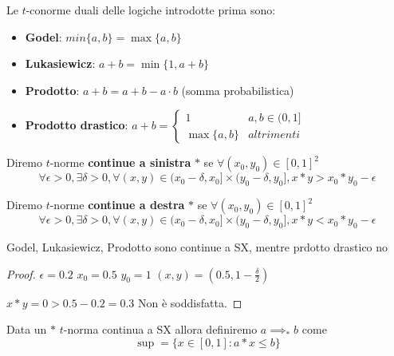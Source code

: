\begin{esempio}
    Le $t$-conorme duali delle logiche introdotte prima sono:
    \begin{itemize}
        \item \textbf{Godel}: $min\{a,b\} = \max\{a,b\}$
        \item \textbf{Lukasiewicz}: $a+b = \min\{1,a+b\}$
        \item \textbf{Prodotto}: $a+b = a+b-a\cdot b$ (somma probabilistica)
        \item \textbf{Prodotto drastico}: $a+b =\begin{cases}
            1& a,b\in (0,1]\\
            \max\{a,b\} & altrimenti
        \end{cases}$
    \end{itemize} 
\end{esempio}

\begin{definizione}
    Diremo $t$-norme \textbf{continue a sinistra} $\ast$ se $\forall (x_0,y_0)\in [0,1]^2$
    $$\forall \epsilon >0, \exists \delta >0, \forall (x,y)\in (x_0  -\delta, x_0] \times (y_0-\delta, y_0], x\ast y > x_0 \ast y_0 -\epsilon$$
\end{definizione}
\begin{definizione}
    Diremo $t$-norme \textbf{continue a destra} $\ast$ se $\forall (x_0,y_0)\in [0,1]^2$
    $$\forall \epsilon >0, \exists \delta >0, \forall (x,y)\in (x_0  -\delta, x_0] \times (y_0-\delta, y_0], x\ast y < x_0 \ast y_0 -\epsilon$$
\end{definizione}

\begin{esempio}
    Godel, Lukasiewicz, Prodotto sono continue a SX, mentre prdotto drastico no
    \begin{proof}
        $\epsilon =0.2$ $x_0=0.5$ $y_0=1$ $(x,y)=(0.5,1-\frac{\delta}{2})$

        $x\ast y = 0 > 0.5 - 0.2 = 0.3$
        Non è soddisfatta. 
    \end{proof}
\end{esempio}
\begin{definizione}
    Data un $\ast$ $t$-norma continua a SX allora definiremo $a\implies_\ast b$ come 
    $$\sup = \{x\in [0,1]:a\ast x \le b\}$$
\end{definizione}

